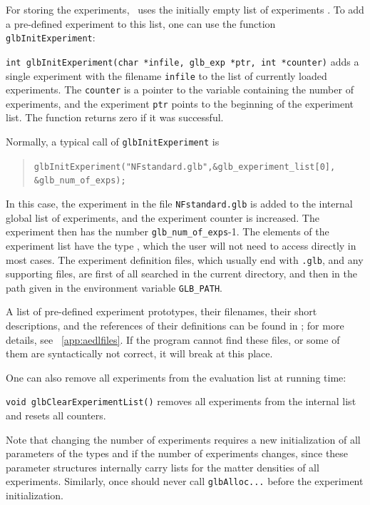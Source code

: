  
For storing the experiments, \GLOBES\ uses the initially empty list of experiments . To add a pre-defined experiment to this list, one can use the function {\tt glbInitExperiment}:
\begin{function}
{\tt int glbInitExperiment(char *infile, glb\_exp *ptr, int *counter)}
 adds a single experiment with the filename {\tt infile} to the list of currently loaded experiments. The {\tt counter} is a pointer to the 
 variable containing the number of experiments, and the experiment {\tt ptr}
 points to the beginning of the experiment list. The function returns
 zero if it was successful. 
\end{function}
Normally, a typical  call of {\tt glbInitExperiment} is 
\begin{quote}
{\tt glbInitExperiment("NFstandard.glb",\&glb\_experiment\_list[0],\\  \hspace*{8cm} \&glb\_num\_of\_exps); }
\end{quote}
In this case, the experiment in the file {\tt NFstandard.glb} is added to the internal global list of experiments, and the experiment counter is increased. The
experiment then has the number {\tt glb\_num\_of\_exps}-1. The elements
of the experiment list have the type , which the
user will not need to access directly in most cases. The experiment definition files, which usually end with {\tt .glb}, and any
supporting files, are first of all searched in the current directory, and then in the path given in the environment variable \verb+GLB_PATH+.
%
%

A list of pre-defined experiment prototypes, their filenames, their short descriptions, and the references of their definitions can be found in ; for more details, see \App~\ref{app:aedlfiles}. If the program cannot find these files, or some of them are syntactically not correct, it will break at this place. 

One can also remove all experiments from the evaluation list at running
 time:
\begin{function}
{\tt void glbClearExperimentList()} removes all experiments from the internal list and resets all counters.   
\end{function}
Note that changing the number of experiments requires a new initialization
of all parameters of the types  and 
if the number of experiments changes, since these parameter structures internally carry lists for the matter densities of all experiments. Similarly, once should never call {\tt glbAlloc...} before the
experiment initialization.

